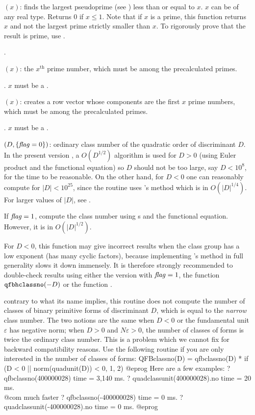 $(x)$: finds the largest pseudoprime (see
) less than or equal to $x$. $x$ can be of any real type.
Returns 0 if $x\le1$. Note that if $x$ is a prime, this function returns $x$
and not the largest prime strictly smaller than $x$. To rigorously prove that
the result is prime, use .

.

$(x)$: the $x^{\text{th}}$ prime number, which must be among
the precalculated primes.

. $x$ must be a .

$(x)$: creates a row vector whose components
are the first $x$ prime numbers, which must be among the precalculated primes.

. $x$ must be a .

$(D,\{\hbox{\it f\kern0pt lag\/}=0\})$: ordinary class number of the quadratic
order of discriminant $D$. In the present version \vers, a $O(D^{1/2})$
algorithm is used for $D > 0$ (using Euler product and the functional
equation) so $D$ should not be too large, say $D < 10^8$, for the time to be
reasonable. On the other hand, for $D < 0$ one can reasonably compute
 for $|D|<10^{25}$, since the routine uses
's method which is in $O(|D|^{1/4})$. For larger values of $|D|$,
see .

If $\hbox{\it f\kern0pt lag\/}=1$, compute the class number using s and the
functional equation. However, it is in $O(|D|^{1/2})$.

 For $D < 0$, this function may give incorrect
results when the class group has a low exponent (has many cyclic factors),
because implementing 's method in full generality slows it down
immensely. It is therefore strongly recommended to double-check results using
either the version with $\hbox{\it f\kern0pt lag\/} = 1$, the function ${\tt qfbhclassno}(-D)$ or
the function .

 contrary to what its name implies, this routine does not
compute the number of classes of binary primitive forms of discriminant $D$,
which is equal to the \emph{narrow} class number. The two notions are the same
when $D < 0$ or the fundamental unit $\varepsilon$ has negative norm; when $D
> 0$ and $N\varepsilon > 0$, the number of classes of forms is twice the
ordinary class number. This is a problem which we cannot fix for backward
compatibility reasons. Use the following routine if you are only interested
in the number of classes of forms:
\bprog
QFBclassno(D) =
  qfbclassno(D) * if (D < 0 || norm(quadunit(D)) < 0, 1, 2)
@eprog
\noindent Here are a few examples:
\bprog
? qfbclassno(400000028)
time = 3,140 ms.
? quadclassunit(400000028).no
time = 20 ms. \\@com{ much faster}
? qfbclassno(-400000028)
time = 0 ms.
? quadclassunit(-400000028).no
time = 0 ms.
@eprog

